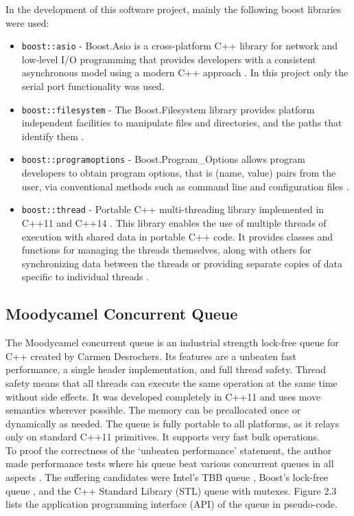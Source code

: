 In the development of this software project, mainly the following boost libraries were used:
\begin{itemize}
\item \texttt{boost::asio} - Boost.Asio is a cross-platform C++ library for network and low-level I/O programming that provides developers with a consistent asynchronous model using a modern C++ approach \cite{boost_asio}. In this project only the serial port functionality was used.
\item \texttt{boost::filesystem} - The Boost.Filesystem library provides platform independent facilities to manipulate files and directories, and the paths that identify them \cite{boost_files}.
\item \texttt{boost::programoptions} - Boost.Program\_Options allows program developers to obtain program options, that is (name, value) pairs from the user, via conventional methods such as command line and configuration files \cite{boost_po}. 
\item \texttt{boost::thread} - Portable C++ multi-threading library implemented in C++11 \cite{cpp_11} and C++14 \cite{cpp_14}. This library enables the use of multiple threads of execution with shared data in portable C++ code. It provides classes and functions for managing the threads themselves, along with others for synchronizing data between the threads or providing separate copies of data specific to individual threads \cite{boost_thread}. 
\end{itemize}
\subsection{Moodycamel Concurrent Queue}
The Moodycamel concurrent queue is an industrial strength lock-free queue for C++ created by Carmen Desrochers. Its features are a unbeaten fast performance, a single header implementation, and full thread safety. Thread safety means that all threads can execute the same operation at the same time without side effects. It was developed completely in C++11 and uses move semantics wherever possible. The memory can be preallocated once or dynamically as needed. The queue is fully portable to all platforms, as it relays only on standard C++11 primitives. It supports very fast bulk operations. \cite{moody}\\
To proof the correctness of the `unbeaten performance' statement, the author made performance tests where his queue beat various concurrent queues in all aspects \cite{benchmark}. The suffering candidates were Intel's TBB queue \cite{intel_tbb}, Boost's lock-free queue \cite{boost_lockfree}, and the C++ Standard Library (STL) queue \cite{std_queue} with mutexes. Figure 2.3 lists the application programming interface (API) of the queue in pseudo-code.

